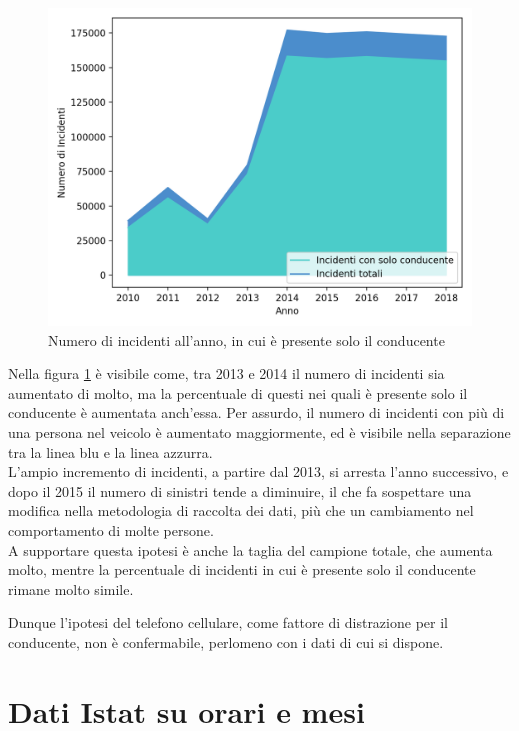 \documentclass[a4paper]{report}
\begin{document}
\begin{figure}
    \includegraphics[width=\linewidth]{../src/incidenti/incidenti_senza_coords/anno/incremento_incidenti.png}
    \caption{Numero di incidenti all'anno, in cui è presente solo il conducente}
    \label{fig:incremento-incidenti}
\end{figure}

Nella figura \ref{fig:incremento-incidenti} è visibile come, 
tra 2013 e 2014 il numero di incidenti sia aumentato di molto, 
ma la percentuale di questi nei quali è presente solo il conducente è aumentata anch'essa.
Per assurdo, il numero di incidenti con più di una persona nel veicolo è aumentato maggiormente, 
ed è visibile nella separazione tra la linea blu e la linea azzurra.\\

L'ampio incremento di incidenti, a partire dal 2013, si arresta l'anno successivo, e dopo il 2015 
il numero di sinistri tende a diminuire, il che fa sospettare una modifica nella metodologia 
di raccolta dei dati, più che un cambiamento nel comportamento di molte persone.\\
A supportare questa ipotesi è anche la taglia del campione totale, che aumenta molto, mentre la 
percentuale di incidenti in cui è presente solo il conducente rimane molto simile.

Dunque l'ipotesi del telefono cellulare, come fattore di distrazione per il conducente, 
non è confermabile, perlomeno con i dati di cui si dispone.

\section{Dati Istat su orari e mesi}
\end{document}
